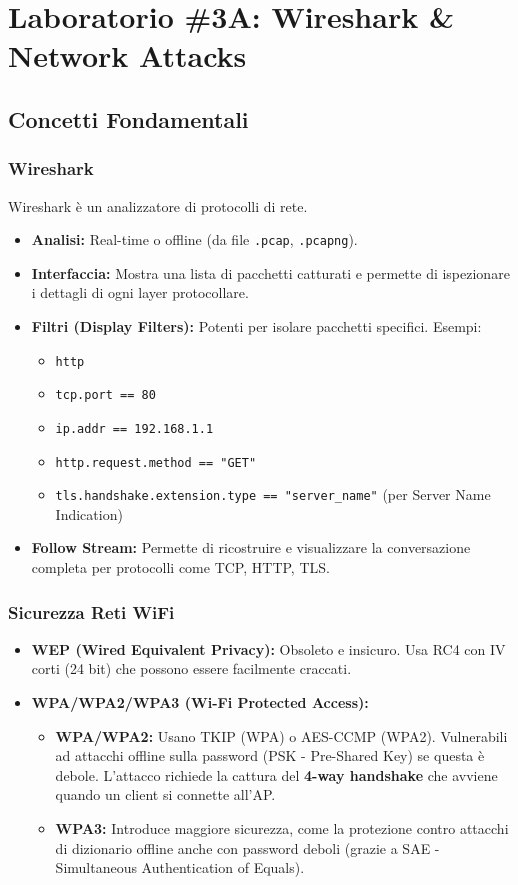 \newpage
\section{Laboratorio \#3A: Wireshark \& Network Attacks}

\subsection{Concetti Fondamentali}

\subsubsection{Wireshark}
Wireshark è un analizzatore di protocolli di rete.
\begin{itemize}
    \item \textbf{Analisi:} Real-time o offline (da file \texttt{.pcap}, \texttt{.pcapng}).
    \item \textbf{Interfaccia:} Mostra una lista di pacchetti catturati e permette di ispezionare i dettagli di ogni layer protocollare.
    \item \textbf{Filtri (Display Filters):} Potenti per isolare pacchetti specifici. Esempi:
    \begin{itemize}
        \item \texttt{http}
        \item \texttt{tcp.port == 80}
        \item \texttt{ip.addr == 192.168.1.1}
        \item \texttt{http.request.method == "GET"}
        \item \texttt{tls.handshake.extension.type == "server\_name"} (per Server Name Indication)
    \end{itemize}
    \item \textbf{Follow Stream:} Permette di ricostruire e visualizzare la conversazione completa per protocolli come TCP, HTTP, TLS.
\end{itemize}

\subsubsection{Sicurezza Reti WiFi}
\begin{itemize}
    \item \textbf{WEP (Wired Equivalent Privacy):} Obsoleto e insicuro. Usa RC4 con IV corti (24 bit) che possono essere facilmente craccati.
    \item \textbf{WPA/WPA2/WPA3 (Wi-Fi Protected Access):}
    \begin{itemize}
        \item \textbf{WPA/WPA2:} Usano TKIP (WPA) o AES-CCMP (WPA2). Vulnerabili ad attacchi offline sulla password (PSK - Pre-Shared Key) se questa è debole. L'attacco richiede la cattura del \textbf{4-way handshake} che avviene quando un client si connette all'AP.
        \item \textbf{WPA3:} Introduce maggiore sicurezza, come la protezione contro attacchi di dizionario offline anche con password deboli (grazie a SAE - Simultaneous Authentication of Equals).
    \end{itemize}
\end{itemize}

